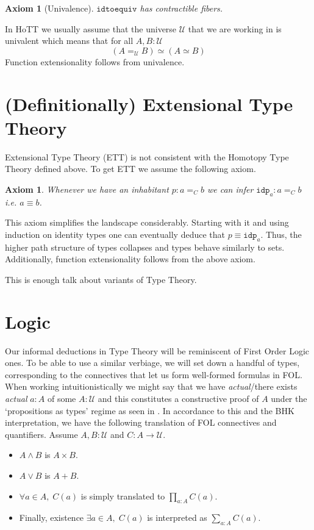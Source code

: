 \documentclass[12pt]{report}
\newtheorem{axiom}[thm]{Axiom}
\begin{document}
\begin{axiom}[Univalence]
$\mathtt{idtoequiv}$ has contractible fibers.
\end{axiom}
In HoTT we usually assume that the universe $\mathcal{U}$ that we are working in is univalent which means that for all $A,B: \mathcal{U}$
$$(A=_\mathcal{U}B) \simeq (A \simeq B)$$
Function extensionality follows from univalence. 

\section{(Definitionally) Extensional Type Theory}
Extensional Type Theory (ETT) is not consistent with the Homotopy Type Theory defined above. 
To get ETT we assume the following axiom. 
\begin{axiom}
Whenever we have an inhabitant $p : a=_C b$ we can infer $\mathtt{idp}_a : a=_C b$ i.e. $a \equiv b$. 
\end{axiom}
This axiom simplifies the landscape considerably. 
Starting with it and using induction on identity types one can eventually deduce that $p \equiv \mathtt{idp}_a$. 
Thus, the higher path structure of types collapses and types behave similarly to sets. 
Additionally, function extensionality follows from the above axiom. 

This is enough talk about variants of Type Theory.
\section{Logic}
Our informal deductions in Type Theory will be reminiscent of First Order Logic ones. 
To be able to use a similar verbiage, we will set down a handful of types, corresponding to the connectives that let us form well-formed formulas in FOL. 
When working intuitionistically we might say that we have \textit{actual}/there exists \textit{actual} $a : A$ of some $A : \mathcal{U}$ 
and this constitutes a constructive proof of $A$ under the `propositions as types' regime as seen in \cite{hottbook}. 
In accordance to this and the BHK interpretation, we have the following translation of FOL connectives and quantifiers. 
Assume $A, B : \mathcal{U}$ and $C : A \rightarrow \mathcal{U}$.
\begin{itemize}
\item $A \wedge B$ is $A \times B$.
\item $A \vee B$ is $A+ B$.
\item $\forall a\in A,\; C(a)$ is simply translated to $\prod_{a : A}C(a)$. 
\item Finally, existence $ \exists a \in A,\; C(a)$ is interpreted as $\sum_{a : A}C(a)$.
\end{itemize}
\end{document}

